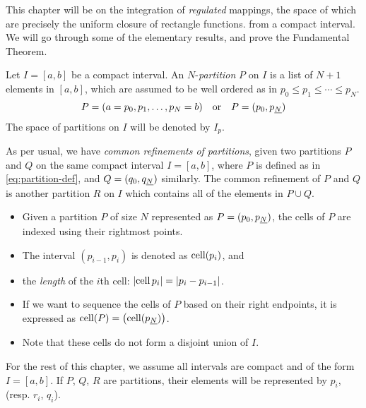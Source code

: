 \documentclass[../main-v2-manifolds.tex]{subfiles}
\begin{document}
\newpage
{}
This chapter will be on the integration of \emph{regulated} mappings, the space of which are precisely the uniform closure of rectangle functions. from a compact interval. We will go through some of the elementary results, and prove the Fundamental Theorem.
\begin{definition}[Partition on {$[a,b]$}]
Let $I=[a,b]$ be a compact interval. An  $N$-\emph{partition} $P$ on $I$ is a list of $N+1$ elements in $[a,b]$, which are assumed to be well ordered as in $p_0\leq p_1\leq\cdots\leq p_N$. 
\begin{equation}\label{eq:partition-def}
    P = (a = p_0,p_1,\ldots,p_N = b)\qqtext{or} P = (p_0,\UL{p}[N])
\end{equation}
The space of partitions on $I$ will be denoted by $I_p$.
\end{definition}
As per usual, we have \emph{common refinements of partitions}, given two partitions $P$ and $Q$ on the same compact interval $I=[a,b]$, where $P$ is defined as in \cref{eq:partition-def}, and $Q = (q_0,\UL{q}[N])$ similarly. The common refinement of $P$ and $Q$ is another partition $R$ on $I$ which contains all of the elements in $P\cup Q$. 
\begin{itemize}
    \item Given a partition \( P \) of size \( N \) represented as \( P = (p_0, \UL{p}[N]) \), the cells of \( P \) are indexed using their rightmost points.
    \item The interval \((p_{i-1}, p_i)\) is denoted as \(\operatorname{cell}(p_i)\), and 
    \item the \emph{length} of the $i$th cell: $\vert {\operatorname{cell}{p_i}} \vert=\vert {p_i - p_{i-1}} \vert$.
    \item If we want to sequence the cells of \( P \) based on their right endpoints, it is expressed as \( \cell(P) = \qty(\cell(\UL{p}[N])) \).
    
    \item Note that these cells do not form a disjoint union of $I$.
\end{itemize}
\begin{remark}
For the rest of this chapter, we assume all intervals are compact and of the form $I = [a,b]$. If $P$, $Q$, $R$ are partitions, their elements will be represented by $p_i$, (resp. $r_i$, $q_i$).
\end{remark}
\end{document}

